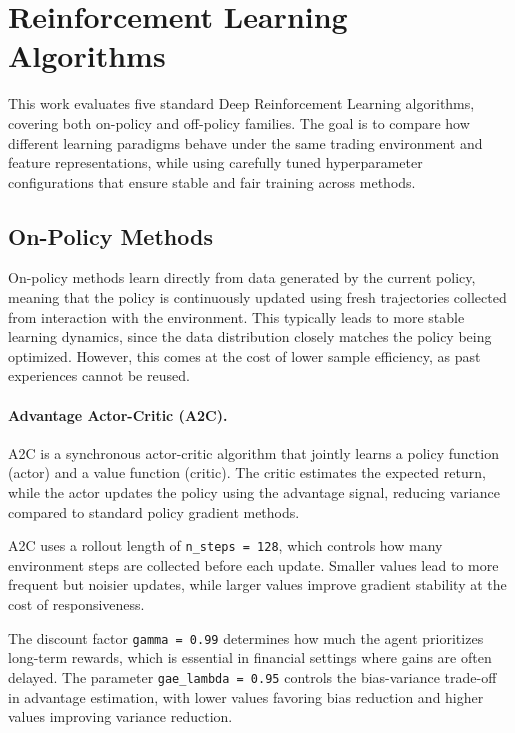 \section{Reinforcement Learning Algorithms}

This work evaluates five standard Deep Reinforcement Learning algorithms, covering both 
on-policy and off-policy families. The goal is to compare how different learning paradigms 
behave under the same trading environment and feature representations, while using carefully 
tuned hyperparameter configurations that ensure stable and fair training across methods.

\subsection{On-Policy Methods}

On-policy methods learn directly from data generated by the current policy, meaning that 
the policy is continuously updated using fresh trajectories collected from interaction with 
the environment. This typically leads to more stable learning dynamics, since the data 
distribution closely matches the policy being optimized. However, this comes at the cost 
of lower sample efficiency, as past experiences cannot be reused.

\paragraph{Advantage Actor-Critic (A2C).} 
A2C is a synchronous actor-critic algorithm that jointly learns a policy function (actor) 
and a value function (critic). The critic estimates the expected return, while the actor 
updates the policy using the advantage signal, reducing variance compared to standard policy 
gradient methods.

A2C uses a rollout length of \texttt{n\_steps = 128}, which controls how many
environment steps are collected before each update. Smaller values lead to more frequent but
noisier updates, while larger values improve gradient stability at the cost of responsiveness.

The discount factor \texttt{gamma = 0.99} determines how much the agent prioritizes long-term
rewards, which is essential in financial settings where gains are often delayed. The parameter
\texttt{gae\_lambda = 0.95} controls the bias-variance trade-off in advantage estimation,
with lower values favoring bias reduction and higher values improving variance reduction.

